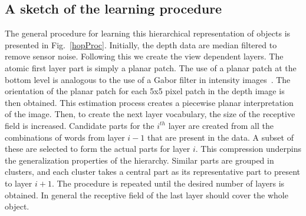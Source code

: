 \documentclass[letterpaper,10pt,conference]{ieeeconf}  %
\begin{document}
\subsection{A sketch of the learning procedure}
The general procedure for learning this hierarchical representation of objects is presented in Fig.~\ref{hopProc}. Initially, the depth data are median filtered to remove sensor noise. Following this we create the view dependent layers. The atomic first layer part is simply a planar patch. The use of a planar patch at the bottom level is analogous to the use of a Gabor filter in intensity images~\cite{Fiedler2014}.  The orientation of the planar patch for each 5x5 pixel patch in the depth image is then obtained. This estimation process creates a piecewise planar interpretation of the image. Then, to create the next layer vocabulary, the size of the receptive field is increased. Candidate parts for the $i^{th}$ layer are created from all the combinations of words from layer $i-1$ that are present in the data. A subset of these are selected to form the actual parts for layer $i$. This compression underpins the generalization properties of the hierarchy. Similar parts are grouped in clusters, and each cluster takes a central part as its representative part to present to layer $i+1$. The procedure is repeated until the desired number of layers is obtained. In general the receptive field of the last layer should cover the whole object.
\end{document}
